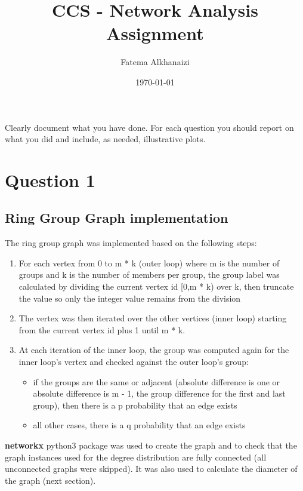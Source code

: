 \documentclass[11pt,a4paper,notitlepage]{article}
\title{CCS - Network Analysis Assignment}
\author{Fatema Alkhanaizi}
\date{\today}
\begin{document}
\graphicspath{ {../distributions/q2/} {../distributions/q1/} {../distributions/q3/} }

\maketitle

\noindent
Clearly document what you have done. For each question you should report on what you did and include, as needed, illustrative plots.

\section*{Question 1}
\subsection*{Ring Group Graph implementation}
The ring group graph was implemented based on the following steps:
\begin{enumerate}
    \item For each vertex from 0 to m * k (outer loop) where m is the number of groups and k is the number of members per group, the group label was calculated by dividing the current vertex id [0,m * k) over k, then truncate the value so only the integer value remains from the division
    \item The vertex was then iterated over the other vertices (inner loop) starting from the current vertex id plus 1 until m * k. 
    \item At each iteration of the inner loop, the group was computed again for the inner loop's vertex and checked against the outer loop's group:
    \begin{itemize}
        \item if the groups are the same or adjacent (absolute difference is one or absolute difference is m - 1, the group difference for the first and last group), then there is a p probability that an edge exists
        \item all other cases, there is a q probability that an edge exists
    \end{itemize}
\end{enumerate}
\textbf{networkx} python3 package was used to create the graph and to check that the graph instances used for the degree distribution are fully connected (all unconnected graphs were skipped). It was also used to calculate the diameter of the graph (next section).
\end{document}
